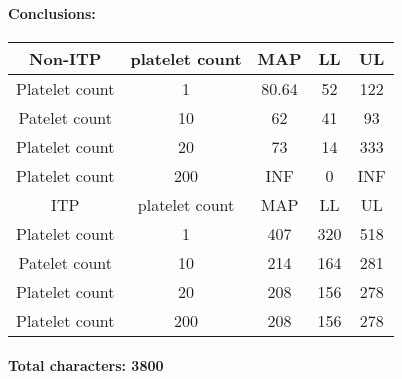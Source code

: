 \documentclass[11pt]{article}
\begin{document}
\paragraph{Conclusions:}


\begin{center}
 \begin{tabular}{||c c c c c||}
 \hline
 Non-ITP   & platelet count & MAP & LL & UL \\ [0.5ex]
 \hline\hline
 Platelet count & 1 & 80.64 & 52 & 122 \\
 \hline
 Patelet count & 10 & 62 & 41 & 93 \\
 \hline
 Platelet count & 20 & 73 & 14  & 333 \\
 \hline
 Platelet count & 200 & INF & 0 & INF \\
 \hline\hline
  ITP   & platelet count & MAP & LL & UL    \\
\hline\hline
 Platelet count & 1 & 407 & 320  & 518 \\
 \hline
 Patelet count & 10 & 214 & 164 & 281 \\
 \hline
 Platelet count & 20 & 208 & 156 & 278 \\
 \hline
 Platelet count & 200 & 208 & 156 & 278 \\ [1ex]
 \hline
\end{tabular}
\end{center}


\paragraph{}
\textbf{Total characters: 3800}
\end{document}
